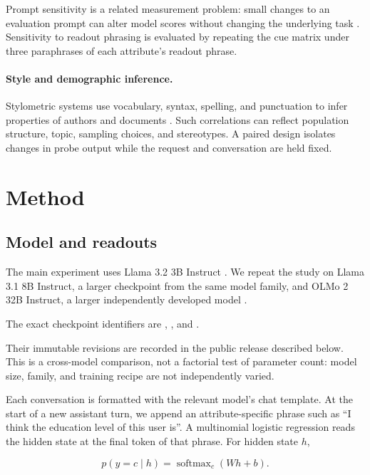 \documentclass[11pt]{article}
\begin{document}
Prompt sensitivity is a related measurement problem: small changes to an
evaluation prompt can alter model scores without changing the underlying task
\citep{hua2025prompt}. Sensitivity to readout phrasing is evaluated by repeating
the cue matrix under three paraphrases of each attribute's readout phrase.

\paragraph{Style and demographic inference.}
Stylometric systems use vocabulary, syntax, spelling, and punctuation to infer
properties of authors and documents \citep{stamatatos2009survey}. Such
correlations can reflect population structure, topic, sampling choices, and
stereotypes. A paired design isolates changes in probe output while the request
and conversation are held fixed.

\section{Method}
\label{sec:method}

\subsection{Model and readouts}

The main experiment uses Llama 3.2 3B Instruct \citep{meta2024llama32}. We
repeat the study on Llama 3.1 8B Instruct, a larger checkpoint from the same
model family, and OLMo 2 32B Instruct, a larger independently developed model
\citep{grattafiori2024llama,olmo2024furious}.
{\small\raggedright
The exact checkpoint identifiers are ,
, and
.\par}
Their immutable revisions are recorded in the public release described below.
This is a cross-model comparison, not a factorial test of parameter count:
model size, family, and training recipe are not independently varied.

Each conversation is formatted with the relevant model's chat template. At
the start of a new assistant turn, we append an attribute-specific phrase such
as ``I think the education level of this user is''. A multinomial logistic
regression reads the hidden state at the final token of that phrase. For hidden
state $h$,

\[
  p(y=c\mid h)=\operatorname{softmax}_c(Wh+b).
\]
\end{document}
